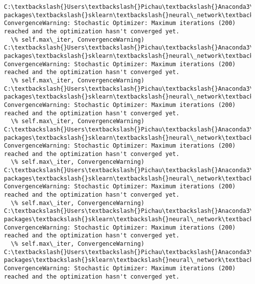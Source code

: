 \documentclass[11pt]{article}
\begin{document}
    \begin{Verbatim}[commandchars=\\\{\}]
C:\textbackslash{}Users\textbackslash{}Pichau\textbackslash{}Anaconda3\textbackslash{}lib\textbackslash{}site-packages\textbackslash{}sklearn\textbackslash{}neural\_network\textbackslash{}multilayer\_perceptron.py:564: ConvergenceWarning: Stochastic Optimizer: Maximum iterations (200) reached and the optimization hasn't converged yet.
  \% self.max\_iter, ConvergenceWarning)
C:\textbackslash{}Users\textbackslash{}Pichau\textbackslash{}Anaconda3\textbackslash{}lib\textbackslash{}site-packages\textbackslash{}sklearn\textbackslash{}neural\_network\textbackslash{}multilayer\_perceptron.py:564: ConvergenceWarning: Stochastic Optimizer: Maximum iterations (200) reached and the optimization hasn't converged yet.
  \% self.max\_iter, ConvergenceWarning)
C:\textbackslash{}Users\textbackslash{}Pichau\textbackslash{}Anaconda3\textbackslash{}lib\textbackslash{}site-packages\textbackslash{}sklearn\textbackslash{}neural\_network\textbackslash{}multilayer\_perceptron.py:564: ConvergenceWarning: Stochastic Optimizer: Maximum iterations (200) reached and the optimization hasn't converged yet.
  \% self.max\_iter, ConvergenceWarning)
C:\textbackslash{}Users\textbackslash{}Pichau\textbackslash{}Anaconda3\textbackslash{}lib\textbackslash{}site-packages\textbackslash{}sklearn\textbackslash{}neural\_network\textbackslash{}multilayer\_perceptron.py:564: ConvergenceWarning: Stochastic Optimizer: Maximum iterations (200) reached and the optimization hasn't converged yet.
  \% self.max\_iter, ConvergenceWarning)
C:\textbackslash{}Users\textbackslash{}Pichau\textbackslash{}Anaconda3\textbackslash{}lib\textbackslash{}site-packages\textbackslash{}sklearn\textbackslash{}neural\_network\textbackslash{}multilayer\_perceptron.py:564: ConvergenceWarning: Stochastic Optimizer: Maximum iterations (200) reached and the optimization hasn't converged yet.
  \% self.max\_iter, ConvergenceWarning)
C:\textbackslash{}Users\textbackslash{}Pichau\textbackslash{}Anaconda3\textbackslash{}lib\textbackslash{}site-packages\textbackslash{}sklearn\textbackslash{}neural\_network\textbackslash{}multilayer\_perceptron.py:564: ConvergenceWarning: Stochastic Optimizer: Maximum iterations (200) reached and the optimization hasn't converged yet.
  \% self.max\_iter, ConvergenceWarning)
C:\textbackslash{}Users\textbackslash{}Pichau\textbackslash{}Anaconda3\textbackslash{}lib\textbackslash{}site-packages\textbackslash{}sklearn\textbackslash{}neural\_network\textbackslash{}multilayer\_perceptron.py:564: ConvergenceWarning: Stochastic Optimizer: Maximum iterations (200) reached and the optimization hasn't converged yet.

\end{Verbatim}
\end{document}
